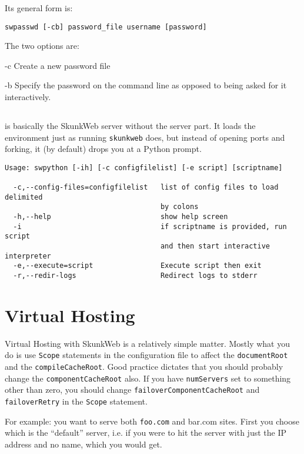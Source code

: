 \documentclass[titlepage]{manual}
\begin{document}
Its general form is:
\begin{verbatim}
swpasswd [-cb] password_file username [password]
\end{verbatim}

The two options are:
\begin{argdesc}
\item[-c] Create a new password file
\item[-b] Specify the password on the command line as opposed to being
asked for it interactively.
\end{argdesc}


\section{\swpython}
\label{swpython}
\index{\swpython}
\swpython is basically the SkunkWeb server without the server part.  It
loads the environment just as running \texttt{skunkweb} does, but instead
of opening ports and forking, it (by default) drops you at a Python prompt.

\begin{verbatim}
Usage: swpython [-ih] [-c configfilelist] [-e script] [scriptname]

  -c,--config-files=configfilelist   list of config files to load delimited
                                     by colons
  -h,--help                          show help screen
  -i                                 if scriptname is provided, run script
                                     and then start interactive interpreter
  -e,--execute=script                Execute script then exit
  -r,--redir-logs                    Redirect logs to stderr
\end{verbatim}


\chapter{Virtual Hosting}
Virtual Hosting with SkunkWeb is a relatively simple matter.  Mostly
what you do is use \texttt{Scope} statements in the configuration file
to affect the \texttt{documentRoot} and the \texttt{compileCacheRoot}.
Good practice dictates that you should probably change the
\texttt{componentCacheRoot} also.  If you have \texttt{numServers} set
to something other than zero, you should change
\texttt{failoverComponentCacheRoot} and \texttt{failoverRetry} in the
\texttt{Scope} statement.

For example:  you want to serve both \texttt{foo.com} and {bar.com} sites.
First you choose which is the ``default'' server, i.e. if you were to hit
the server with just the IP address and no name, which you would get.
\end{document}
